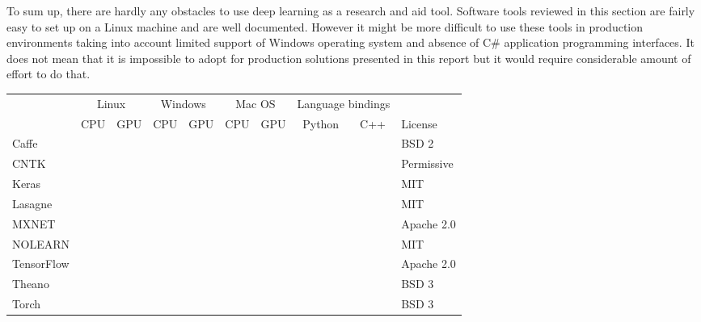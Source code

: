 \documentclass[a4paper, 11pt, table]{article}
\newcommand{\cmark}{\ding{51}}%
\newcommand{\xmark}{\ding{55}}%
\newcommand{\ymark}{\textcolor{clyes}{\cmark}}%
\newcommand{\nmark}{\textcolor{clno}{\xmark}}%
\begin{document}
To sum up, there are hardly any obstacles to use deep learning as a research and aid tool. Software tools reviewed in this section are fairly easy to set up on a Linux machine and are well documented. However it might be more difficult to use these tools in production environments taking into account limited support of Windows operating system and absence of C\# application programming interfaces. It does not mean that it is impossible to adopt for production solutions presented in this report but it would require considerable amount of effort to do that.

\begin{landscape}
\begin{center}
\label{tbl:comparison_of_dl_lib}
\begin{tabular}{lccccccccl}
\hline 
 & \multicolumn{2}{c}{\cellcolor{linux}Linux} & \multicolumn{2}{c}{\cellcolor{windows}Windows} & \multicolumn{2}{c}{\cellcolor{macos}Mac OS} & \multicolumn{2}{c}{Language bindings} &  \\ 
 & \cellcolor{linux}CPU & \cellcolor{linux}GPU & \cellcolor{windows}CPU & \cellcolor{windows}GPU & \cellcolor{macos}CPU & \cellcolor{macos}GPU & Python & C++ & License\\ 
\hline 
Caffe & \ymark & \ymark & \ymark & \ymark & \ymark & \ymark & \ymark & \nmark & BSD 2\\ 
CNTK & \ymark & \ymark & \ymark & \ymark & \nmark & \nmark & \ymark & \ymark & Permissive \\ 
Keras & \ymark & \ymark & \ymark & \ymark & \ymark & \ymark & \ymark & \nmark & MIT \\ 
Lasagne & \ymark & \ymark & \ymark & \ymark & \ymark & \ymark & \ymark & \nmark & MIT \\ 
MXNET & \ymark & \ymark & \ymark & \ymark & \ymark & \ymark & \ymark & \ymark & Apache 2.0 \\ 
NOLEARN & \ymark & \ymark & \ymark & \ymark & \ymark & \ymark & \ymark & \nmark & MIT \\ 
TensorFlow & \ymark & \ymark & \nmark & \nmark & \ymark & \nmark & \ymark & \ymark & Apache 2.0 \\ 
Theano & \ymark & \ymark & \ymark & \ymark & \ymark & \ymark & \ymark & \nmark & BSD 3\\ 
Torch & \ymark & \ymark & \ymark & \ymark & \ymark & \ymark & \nmark & \ymark & BSD 3\\ 
\end{tabular} 
\end{center}


\end{landscape}
\end{document}

